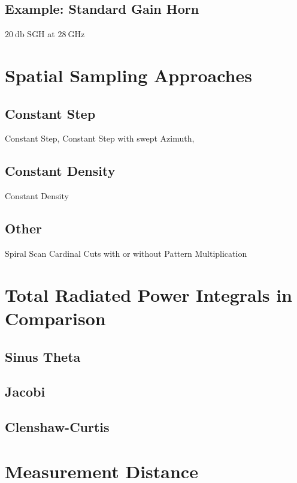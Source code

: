 \subsection{Example: Standard Gain Horn}

$\SI{20}{\decibel}$ \ac{SGH} at $\SI{28}{\giga\hertz}$

\section{Spatial Sampling Approaches}

\subsection{Constant Step}
Constant Step, Constant Step with swept Azimuth,

\subsection{Constant Density}

Constant Density

\subsection{Other}

Spiral Scan
Cardinal Cuts with or without Pattern Multiplication

\section{Total Radiated Power Integrals in Comparison}

\subsection{Sinus Theta}

\subsection{Jacobi}

\subsection{Clenshaw-Curtis}

\section{Measurement Distance}